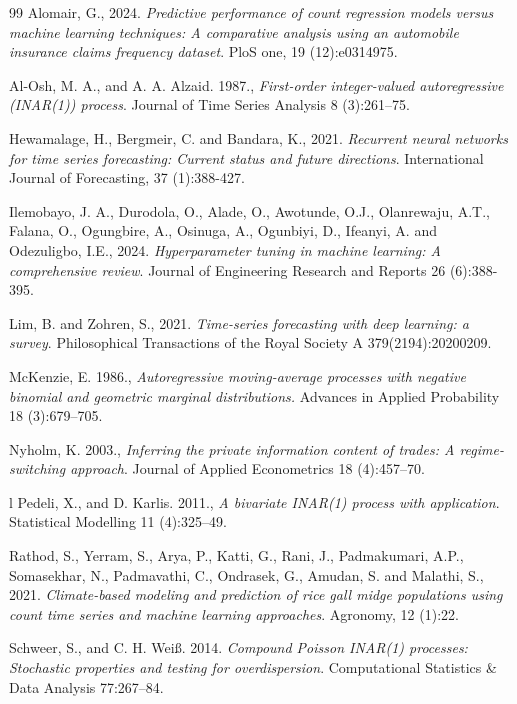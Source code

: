 \documentclass[twoside]{article}
\begin{document}
\begin{thebibliography}{99}
 Alomair, G., 2024. {\it Predictive performance of count regression models versus machine learning techniques: A comparative analysis using an automobile insurance claims frequency dataset}. PloS one, 19 (12):e0314975.

 Al-Osh, M. A., and A. A. Alzaid. 1987., {\it First-order integer-valued autoregressive (INAR(1)) process}. Journal of Time Series Analysis 8 (3):261–75.

 Hewamalage, H., Bergmeir, C. and Bandara, K., 2021. {\it Recurrent neural networks for time series forecasting: Current status and future directions}. International Journal of Forecasting, 37 (1):388-427.

 Ilemobayo, J. A., Durodola, O., Alade, O., Awotunde, O.J., Olanrewaju, A.T., Falana, O., Ogungbire, A., Osinuga, A., Ogunbiyi, D., Ifeanyi, A. and Odezuligbo, I.E., 2024. {\it Hyperparameter tuning in machine learning: A comprehensive review}. Journal of Engineering Research and Reports 26 (6):388-395.

 Lim, B. and Zohren, S., 2021. {\it Time-series forecasting with deep learning: a survey}. Philosophical Transactions of the Royal Society A 379(2194):20200209.

 McKenzie, E. 1986., {\it Autoregressive moving-average processes with negative binomial and geometric marginal distributions.} Advances in Applied Probability 18 (3):679–705. 

 Nyholm, K. 2003., {\it Inferring the private information content of trades: A regime-switching approach}. Journal of Applied Econometrics 18 (4):457–70.

l  Pedeli, X., and D. Karlis. 2011., {\it  A bivariate INAR(1) process with application}. Statistical Modelling 11 (4):325–49.

Rathod, S., Yerram, S., Arya, P., Katti, G., Rani, J., Padmakumari, A.P., Somasekhar, N., Padmavathi, C., Ondrasek, G., Amudan, S. and Malathi, S., 2021. {\it Climate-based modeling and prediction of rice gall midge populations using count time series and machine learning approaches}. Agronomy, 12 (1):22.

 Schweer, S., and C. H. Weiß. 2014. {\it Compound Poisson INAR(1) processes: Stochastic properties and testing for overdispersion}. Computational Statistics \& Data Analysis 77:267–84.
\end{thebibliography}
\end{document}
